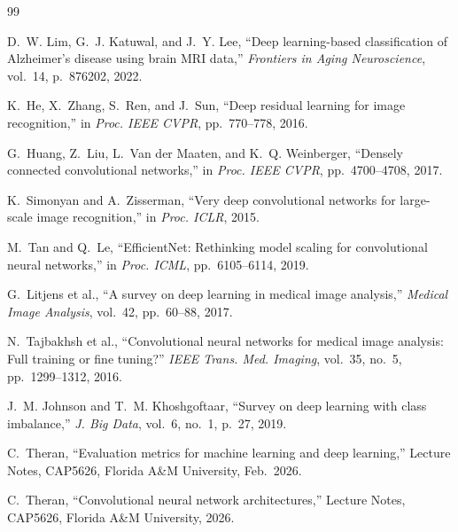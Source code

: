 \documentclass[12pt, a4paper]{article}
\begin{document}

\begin{thebibliography}{99}

D.~W. Lim, G.~J. Katuwal, and J.~Y. Lee,
``Deep learning-based classification of Alzheimer's
disease using brain MRI data,''
\textit{Frontiers in Aging Neuroscience}, vol.~14,
p.~876202, 2022.

K.~He, X.~Zhang, S.~Ren, and J.~Sun,
``Deep residual learning for image recognition,''
in \textit{Proc. IEEE CVPR}, pp.~770--778, 2016.

G.~Huang, Z.~Liu, L.~Van der Maaten,
and K.~Q. Weinberger,
``Densely connected convolutional networks,''
in \textit{Proc. IEEE CVPR}, pp.~4700--4708, 2017.

K.~Simonyan and A.~Zisserman,
``Very deep convolutional networks for large-scale
image recognition,''
in \textit{Proc. ICLR}, 2015.

M.~Tan and Q.~Le,
``EfficientNet: Rethinking model scaling for
convolutional neural networks,''
in \textit{Proc. ICML}, pp.~6105--6114, 2019.

G.~Litjens et al.,
``A survey on deep learning in medical image
analysis,''
\textit{Medical Image Analysis}, vol.~42,
pp.~60--88, 2017.

N.~Tajbakhsh et al.,
``Convolutional neural networks for medical image
analysis: Full training or fine tuning?''
\textit{IEEE Trans. Med. Imaging}, vol.~35, no.~5,
pp.~1299--1312, 2016.

J.~M. Johnson and T.~M. Khoshgoftaar,
``Survey on deep learning with class imbalance,''
\textit{J. Big Data}, vol.~6, no.~1, p.~27, 2019.

C.~Theran,
``Evaluation metrics for machine learning and
deep learning,''
Lecture Notes, CAP5626,
Florida A\&M University, Feb.\ 2026.

C.~Theran,
``Convolutional neural network architectures,''
Lecture Notes, CAP5626,
Florida A\&M University, 2026.

\end{thebibliography}
\end{document}
